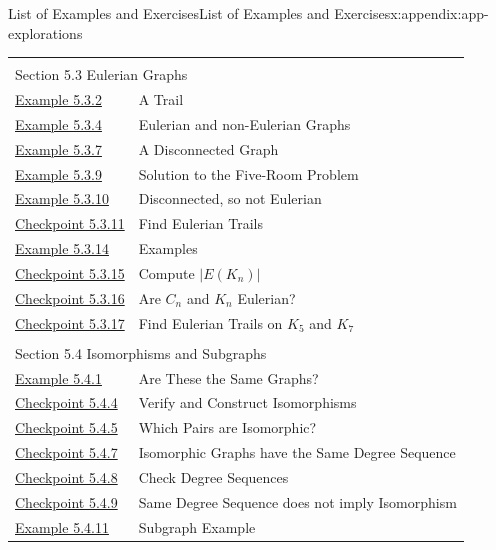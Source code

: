 \documentclass[oneside,10pt,]{book}
\numberwithin{equation}{section}
\begin{document}
\begin{appendixptx}{List of Examples and Exercises}{}{List of Examples and Exercises}{}{}{x:appendix:app-explorations}
\begin{longtable}[l]{ll}
\multicolumn{2}{l}{\null}\\[1.5ex] \multicolumn{2}{l}{\large Section 5.3 Eulerian Graphs}\\[0.5ex]
\hyperref[x:example:eg-graph-trail]{Example 5.3.2}& A Trail\\
\hyperref[x:example:eg-graph-eulerian]{Example 5.3.4}& Eulerian and non-Eulerian Graphs\\
\hyperref[x:example:eg-graph-connected]{Example 5.3.7}& A Disconnected Graph\\
\hyperref[x:example:eg-graph-model-room-solution]{Example 5.3.9}& Solution to the Five-Room Problem\\
\hyperref[x:example:eg-graph-not-eulerian]{Example 5.3.10}& Disconnected, so not Eulerian\\
\hyperref[x:exercise:ex-graph-find-eulerian-trail]{Checkpoint 5.3.11}& Find Eulerian Trails\\
\hyperref[x:example:eg-cycle-complete]{Example 5.3.14}& Examples\\
\hyperref[x:exercise:ex-graph-complete-edges]{Checkpoint 5.3.15}& Compute \(|E(K_n)|\)\\
\hyperref[x:exercise:ex-graph-cycle-complete-degrees]{Checkpoint 5.3.16}& Are \(C_n\) and \(K_n\) Eulerian?\\
\hyperref[x:exercise:ex-graph-complete-find-eulerian]{Checkpoint 5.3.17}& Find Eulerian Trails on \(K_5\) and \(K_7\)\\
\multicolumn{2}{l}{\null}\\[1.5ex] \multicolumn{2}{l}{\large Section 5.4 Isomorphisms and Subgraphs}\\[0.5ex]
\hyperref[x:example:eg-graph-equal-isomorphic]{Example 5.4.1}& Are These the Same Graphs?\\
\hyperref[x:exercise:ex-graph-isomorphism]{Checkpoint 5.4.4}& Verify and Construct Isomorphisms\\
\hyperref[x:exercise:ex-graph-determine-isomorphism]{Checkpoint 5.4.5}& Which Pairs are Isomorphic?\\
\hyperref[x:exercise:ex-graph-isomorphism-degree]{Checkpoint 5.4.7}& Isomorphic Graphs have the Same Degree Sequence\\
\hyperref[x:exercise:ex-graph-isomorphism-degree-check]{Checkpoint 5.4.8}& Check Degree Sequences\\
\hyperref[x:exercise:ex-graph-isomorphism-degree-converse]{Checkpoint 5.4.9}& Same Degree Sequence does not imply Isomorphism\\
\hyperref[x:example:eg-subgraph]{Example 5.4.11}& Subgraph Example\\

\end{longtable}
\end{appendixptx}
\end{document}
